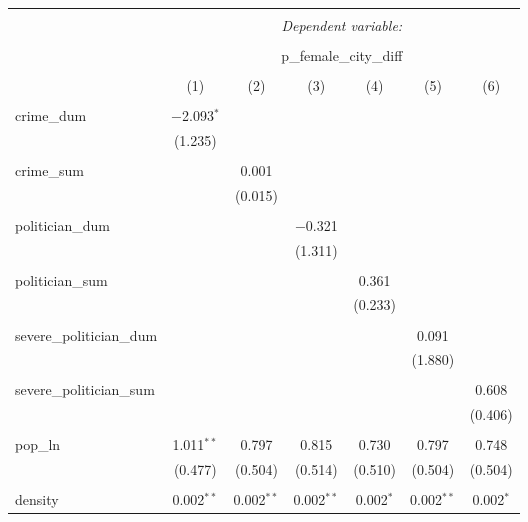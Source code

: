 
\begin{table}[!htbp] \centering 
  \caption{} 
  \label{} 
\begin{tabular}{@{\extracolsep{5pt}}lcccccc} 
\\[-1.8ex]\hline 
\hline \\[-1.8ex] 
 & \multicolumn{6}{c}{\textit{Dependent variable:}} \\ 
\cline{2-7} 
\\[-1.8ex] & \multicolumn{6}{c}{p\_female\_city\_diff} \\ 
\\[-1.8ex] & (1) & (2) & (3) & (4) & (5) & (6)\\ 
\hline \\[-1.8ex] 
 crime\_dum & $-$2.093$^{*}$ &  &  &  &  &  \\ 
  & (1.235) &  &  &  &  &  \\ 
  & & & & & & \\ 
 crime\_sum &  & 0.001 &  &  &  &  \\ 
  &  & (0.015) &  &  &  &  \\ 
  & & & & & & \\ 
 politician\_dum &  &  & $-$0.321 &  &  &  \\ 
  &  &  & (1.311) &  &  &  \\ 
  & & & & & & \\ 
 politician\_sum &  &  &  & 0.361 &  &  \\ 
  &  &  &  & (0.233) &  &  \\ 
  & & & & & & \\ 
 severe\_politician\_dum &  &  &  &  & 0.091 &  \\ 
  &  &  &  &  & (1.880) &  \\ 
  & & & & & & \\ 
 severe\_politician\_sum &  &  &  &  &  & 0.608 \\ 
  &  &  &  &  &  & (0.406) \\ 
  & & & & & & \\ 
 pop\_ln & 1.011$^{**}$ & 0.797 & 0.815 & 0.730 & 0.797 & 0.748 \\ 
  & (0.477) & (0.504) & (0.514) & (0.510) & (0.504) & (0.504) \\ 
  & & & & & & \\ 
 density & 0.002$^{**}$ & 0.002$^{**}$ & 0.002$^{**}$ & 0.002$^{*}$ & 0.002$^{**}$ & 0.002$^{*}$ \\ 

\end{tabular}
\end{table}
